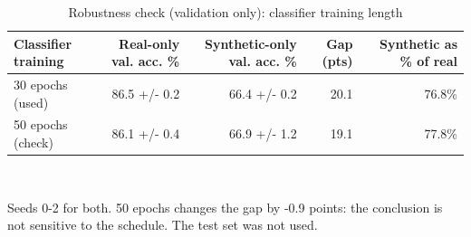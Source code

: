 \begin{table}[t]
\centering
\footnotesize
\caption{Robustness check (validation only): classifier training length}
\label{tab:t12_robustness_epochs}
\begin{tabular}{lrrrr}
\toprule
Classifier training & Real-only val. acc. \% & Synthetic-only val. acc. \% & Gap (pts) & Synthetic as \% of real \\
\midrule
30 epochs (used) & 86.5 +/- 0.2 & 66.4 +/- 0.2 & 20.1 & 76.8\% \\
50 epochs (check) & 86.1 +/- 0.4 & 66.9 +/- 1.2 & 19.1 & 77.8\% \\
\bottomrule
\end{tabular}
\\[2pt]\parbox{\linewidth}{\scriptsize Seeds 0-2 for both. 50 epochs changes the gap by -0.9 points: the conclusion is not sensitive to the schedule. The test set was not used.}
\end{table}
